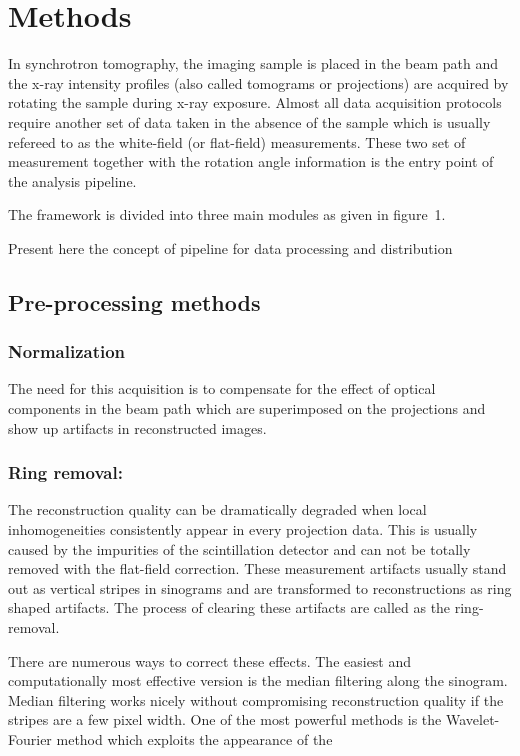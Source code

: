 \documentclass[pdf]{iucr}              %
\begin{document}
\section{Methods} 

In synchrotron tomography, the imaging sample is placed in the beam path and the x-ray intensity profiles (also called tomograms or projections) are acquired by rotating the sample during x-ray exposure. Almost all data acquisition protocols require another set of data taken in the absence of the sample which is usually refereed to as the white-field (or flat-field) measurements. These two set of  measurement together with the rotation angle information is the entry point of the analysis pipeline.

The framework is divided into three main modules as given in figure~1.

Present here the concept of pipeline for data processing and distribution

\subsection{Pre-processing methods}

\subsubsection{Normalization}

The need for this acquisition is to compensate for the effect of optical components in the beam path which are superimposed on the projections and show up artifacts in reconstructed images. 

\subsubsection{Ring removal:}

The reconstruction quality can be dramatically degraded when local inhomogeneities consistently appear in every projection data.  This is usually caused by the impurities of the scintillation detector and can not be totally removed with the flat-field correction. These measurement artifacts usually stand out as vertical stripes in sinograms and are transformed to reconstructions as ring shaped artifacts. The process of clearing these artifacts are called as the ring-removal. 

There are numerous ways to correct these effects. The easiest and computationally most effective version is the median filtering along the sinogram. Median filtering works nicely without compromising reconstruction quality if the stripes are a few pixel width. One of the most powerful methods is the Wavelet-Fourier method which exploits the appearance of the 
\end{document}
